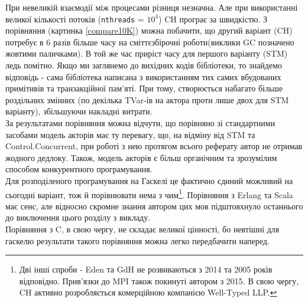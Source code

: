 \documentclass[12pt]{article}
\begin{document}
При невеликій взаємодії між процесами різниця незначна. Але при використанні 
великої кількості потоків (\lstinline{nthreads} = $10^4$) CH програє за швидкістю. 
З порівняння (картинка \ref{compare10K}) можна побачити, що другий варіант (CH) потребує 
в 6 разів більше часу на сміттєзбірочні роботи(виклики GC позначено жовтими паличками). 
В той же час приріст часу для першого варіанту (STM) ледь помітно.
Якщо ми заглянемо до вихідних кодів бібліотеки, то знайдемо відповідь - сама 
бібліотека написана з використанням тих самих вбудованих примітивів та транзакційної
пам'яті. При тому, створюється набагато більше роздільних змінних 
(по декілька TVar-ів на актора проти лише двох для STM варіанту), збільшуючи накладні
витрати.\\

За результатами порівняння можна відчути, що порівняно зі стандартними засобами модель акторів має ту перевагу, що, на відміну від STM та Control.Concurrent, при роботі з нею протягом всього реферату автор не отримав жодного дедлоку. Також, модель акторів є більш органічним та зрозумілим способом конкурентного програмування.\\

Для розподіленого програмування на Гаскелі це фактично єдиний можливий на сьогодні варіант, тож й порівнювати нема з чим\footnote{Дві інші спроби - Eden та GdH не розвиваються з 2014 та 2005 років
відповідно. Прив'язки до MPI також покинуті автором з 2015. 
В свою чергу, CH активно розробляється комерційною компанією Well-Typed LLP.}. Порівняння з Erlang та Scala має сенс, але відносно скромне знання автором цих мов підштовхнуло останнього до виключення цього розділу з викладу.\\

Порівняння з C, в свою чергу, не складає великої цінності, бо невтішні для гаскелю результати такого порівняння можна легко передбачити наперед.
\end{document}
